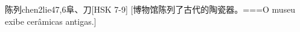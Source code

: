 \begin{EntryWithPhonetic}{陈列}{chen2lie4}{7,6}{⾩、⼑}[HSK 7-9]
  [博物馆陈列了古代的陶瓷器。===O museu exibe cerâmicas antigas.]
\end{EntryWithPhonetic}
